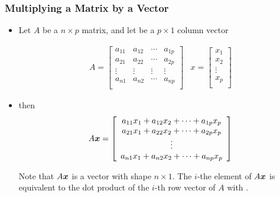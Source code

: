 \documentclass{beamer}
\begin{document}

\begin{frame}
  \frametitle{Multiplying a Matrix by a Vector}


\begin{itemize}
	\item Let $A$ be a $n \times p$ matrix, and let  be a $p \times 1$ column vector

\[
\begin{array}{cc}
A = \left[ \begin{array}{cccc}
a_{11} & a_{12} & \cdots & a_{1p} \\
a_{21} & a_{22} & \cdots & a_{2p} \\
\vdots & \vdots & \vdots & \vdots \\
a_{n1} & a_{n2} & \cdots & a_{np} \\

\end{array}
\right]

&	

x = \left[ \begin{array}{c}
x_1 \\ x_2 \\ \vdots \\x_p \\
\end{array}
\right]
\end{array}
\]	

	
\item then
\[
A\bm{x} = \left[ \begin{array}{c}
a_{11}x_1 + a_{12}x_2 + \cdots + a_{1p}x_p \\
a_{21}x_1 + a_{22}x_2 + \cdots + a_{2p}x_p \\
\vdots \\
a_{n1}x_1 + a_{n2}x_2 + \cdots + a_{np}x_p \\

\end{array}
\right]
\]

Note that $A\bm{x}$ is a vector with shape $n \times 1$. The $i$-the element of $A\bm{x}$ is equivalent to the dot product of the $i$-th row vector of $A$ with .

\end{itemize}

\end{frame}

\end{document}
